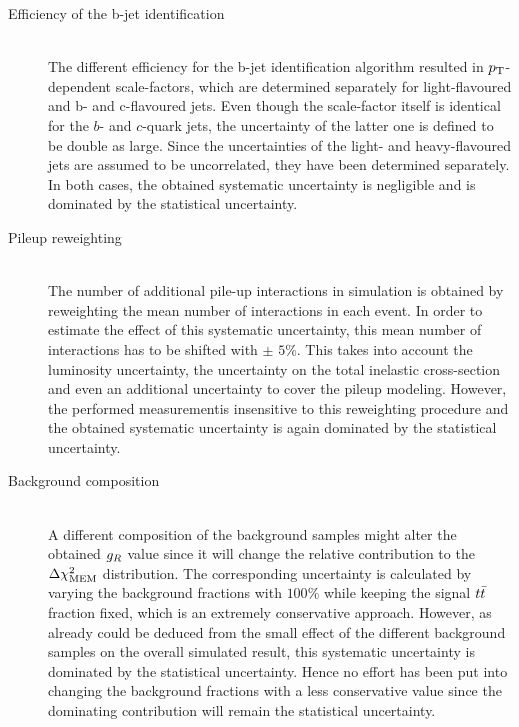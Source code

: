 \begin{myindentpar}
\begin{description}
    \item[Efficiency of the b-jet identification] \hfill \\   %
    The different efficiency for the b-jet identification algorithm resulted in $p_{\rm T}$-dependent scale-factors, which are determined separately for light-flavoured and b- and c-flavoured jets.
    Even though the scale-factor itself is identical for the $b$- and $c$-quark jets, the uncertainty of the latter one is defined to be double as large. 
    Since the uncertainties of the light- and heavy-flavoured jets are assumed to be uncorrelated, they have been determined separately.
    In both cases, the obtained systematic uncertainty is negligible and is dominated by the statistical uncertainty.
    
    \item[Pileup reweighting] \hfill \\
    The number of additional pile-up interactions in simulation is obtained by reweighting the mean number of interactions in each event. 
    In order to estimate the effect of this systematic uncertainty, this mean number of interactions has to be shifted with $\pm$ $5\%$.  
    This takes into account the luminosity uncertainty, the uncertainty on the total inelastic cross-section and even an additional uncertainty to cover the pileup modeling.
    However, the performed measurementis insensitive to this reweighting procedure and the obtained systematic uncertainty is again dominated by the statistical uncertainty.
        
    \item[Background composition] \hfill \\
    A different composition of the background samples might alter the obtained $g_{R}$ value since it will change the relative contribution to the $\Delta \chi^{2}_{\textrm{MEM}}$ distribution.
    The corresponding uncertainty is calculated by varying the background fractions with $100\%$ while keeping the signal $t\bar{t}$ fraction fixed, which is an extremely conservative approach.
    However, as already could be deduced from the small effect of the different background samples on the overall simulated result, this systematic uncertainty is dominated by the statistical uncertainty.
    Hence no effort has been put into changing the background fractions with a less conservative value since the dominating contribution will remain the statistical uncertainty.
                

\end{description}
\end{myindentpar}

